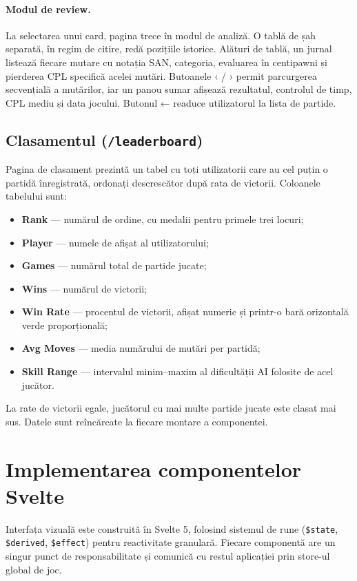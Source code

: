 \documentclass[12pt,a4paper]{article}
\begin{document}
\paragraph{Modul de review.}
La selectarea unui card, pagina trece în modul de analiză. O tablă de șah separată, în regim de citire, redă pozițiile istorice. Alături de tablă, un jurnal listează fiecare mutare cu notația SAN, categoria, evaluarea în centipawni și pierderea CPL specifică acelei mutări. Butoanele ‹ / › permit parcurgerea secvențială a mutărilor, iar un panou sumar afișează rezultatul, controlul de timp, CPL mediu și data jocului. Butonul ← readuce utilizatorul la lista de partide.

\subsection{Clasamentul (\texttt{/leaderboard})}

Pagina de clasament prezintă un tabel cu toți utilizatorii care au cel puțin o partidă înregistrată, ordonați descrescător după rata de victorii. Coloanele tabelului sunt:
\begin{itemize}
  \item \textbf{Rank} — numărul de ordine, cu medalii pentru primele trei locuri;
  \item \textbf{Player} — numele de afișat al utilizatorului;
  \item \textbf{Games} — numărul total de partide jucate;
  \item \textbf{Wins} — numărul de victorii;
  \item \textbf{Win Rate} — procentul de victorii, afișat numeric și printr-o bară orizontală verde proporțională;
  \item \textbf{Avg Moves} — media numărului de mutări per partidă;
  \item \textbf{Skill Range} — intervalul minim–maxim al dificultății AI folosite de acel jucător.
\end{itemize}
La rate de victorii egale, jucătorul cu mai multe partide jucate este clasat mai sus. Datele sunt reîncărcate la fiecare montare a componentei.

\newpage
\section{Implementarea componentelor Svelte}

Interfața vizuală este construită în Svelte 5, folosind sistemul de rune (\texttt{\$state}, \texttt{\$derived}, \texttt{\$effect}) pentru reactivitate granulară. Fiecare componentă are un singur punct de responsabilitate și comunică cu restul aplicației prin store-ul global de joc.
\end{document}
